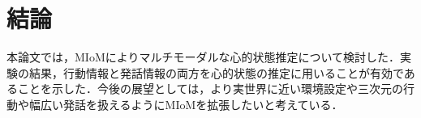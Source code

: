 \chapter{結論}
本論文では，MIoMによりマルチモーダルな心的状態推定について検討した．実験の結果，行動情報と発話情報の両方を心的状態の推定に用いることが有効であることを示した．今後の展望としては，より実世界に近い環境設定や三次元の行動や幅広い発話を扱えるようにMIoMを拡張したいと考えている．
